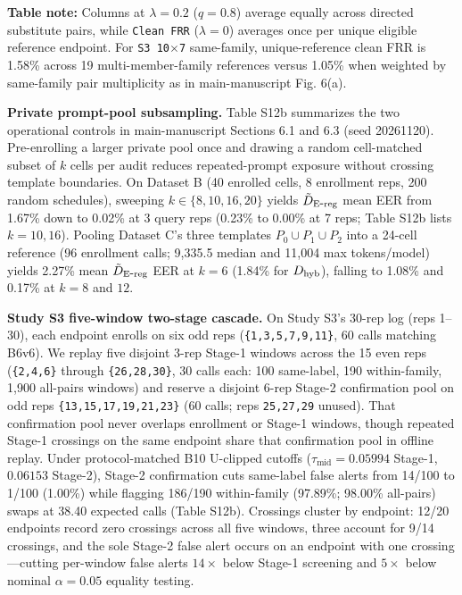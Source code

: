 \textbf{Table note:} Columns at $\lambda = 0.2$ ($q = 0.8$) average equally across directed substitute pairs, while \texttt{Clean FRR} ($\lambda = 0$) averages once per unique eligible reference endpoint. For \texttt{S3 10\ensuremath{\times}7} same-family, unique-reference clean FRR is 1.58\% across 19 multi-member-family references versus 1.05\% when weighted by same-family pair multiplicity as in main-manuscript Fig. 6(a).


\textbf{Private prompt-pool subsampling.} Table S12b summarizes the two operational controls in main-manuscript Sections 6.1 and 6.3 (seed 20261120). Pre-enrolling a larger private pool once and drawing a random cell-matched subset of $k$ cells per audit reduces repeated-prompt exposure without crossing template boundaries. On Dataset B (40 enrolled cells, 8 enrollment reps, 200 random schedules), sweeping $k \in \{8, 10, 16, 20\}$ yields $\tilde D_{\mathrm{E\mbox{-}reg}}{}$ mean EER from 1.67\% down to 0.02\% at 3 query reps (0.23\% to 0.00\% at 7 reps; Table S12b lists $k=10, 16$). Pooling Dataset C's three templates $P_0 \cup P_1 \cup P_2$ into a 24-cell reference (96 enrollment calls; 9,335.5 median and 11,004 max tokens/model) yields 2.27\% mean $\tilde D_{\mathrm{E\mbox{-}reg}}{}$ EER at $k=6$ (1.84\% for $D_{\mathrm{hyb}}{}$), falling to 1.08\% and 0.17\% at $k=8$ and $12$.


\textbf{Study S3 five-window two-stage cascade.} On Study S3's 30-rep log (reps 1--30), each endpoint enrolls on six odd reps (\texttt{\{1,3,5,7,9,11\}}, 60 calls matching B6v6). We replay five disjoint 3-rep Stage-1 windows across the 15 even reps (\texttt{\{2,4,6\}} through \texttt{\{26,28,30\}}, 30 calls each: 100 same-label, 190 within-family, 1,900 all-pairs windows) and reserve a disjoint 6-rep Stage-2 confirmation pool on odd reps \texttt{\{13,15,17,19,21,23\}} (60 calls; reps \texttt{25,27,29} unused). That confirmation pool never overlaps enrollment or Stage-1 windows, though repeated Stage-1 crossings on the same endpoint share that confirmation pool in offline replay. Under protocol-matched B10 U-clipped cutoffs ($\tau_{\mathrm{mid}} = 0.05994$ Stage-1, $0.06153$ Stage-2), Stage-2 confirmation cuts same-label false alerts from 14/100 to 1/100 (1.00\%) while flagging 186/190 within-family (97.89\%; 98.00\% all-pairs) swaps at 38.40 expected calls (Table S12b). Crossings cluster by endpoint: 12/20 endpoints record zero crossings across all five windows, three account for 9/14 crossings, and the sole Stage-2 false alert occurs on an endpoint with one crossing---cutting per-window false alerts $14\times$ below Stage-1 screening and $5\times$ below nominal $\alpha=0.05$ equality testing.


